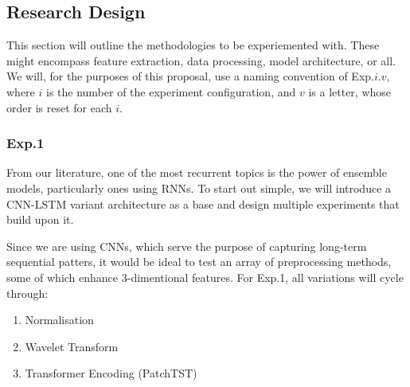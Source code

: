 
\subsection{Research Design}

This section will outline the methodologies to be experiemented with. These might encompass feature extraction, data processing, model architecture, or all. We will, for the purposes of this proposal, use a naming convention of Exp.$i.v$, where $i$ is the number of the experiment configuration, and
$v$ is a letter, whose order is reset for each $i$.

\begin{table}[ht]
\centering
{}
\caption{Exp.1: Model Architectures and Preprocessing}\label{tab:exp1}
\end{table}

\subsubsection{Exp.1}

From our literature, one of the most recurrent topics is the power of ensemble models, particularly ones using RNNs. To start out simple, we will introduce a CNN-LSTM variant architecture as a base and design multiple
experiments that build upon it.

Since we are using CNNs, which serve the purpose of capturing long-term sequential patters, it would be ideal to test an array of preprocessing methods, some of which enhance 3-dimentional features.
For Exp.1, all variations will cycle through:
\begin{enumerate}
    \item Normalisation
    \item Wavelet Transform\cite{4494757,Hiruta2025}
    \item Transformer Encoding (PatchTST\cite{PatchTST})
\end{enumerate}

